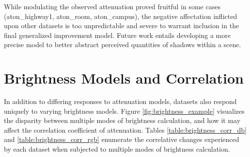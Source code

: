 \documentclass[12pt]{report}
\begin{document}
While modulating the observed attenuation proved fruitful in some cases (aton\_highway1, aton\_room, aton\_campus), the negative affectation inflicted upon other datasets is too unpredictable and severe to warrant inclusion in the final generalized improvement model. Future work entails developing a more precise model to better abstract perceived quantities of shadows within a scene.

\section{Brightness Models and Correlation} \label{section:brightness_models}

In addition to differing responses to attenuation models, datasets also respond uniquely to varying brightness models. Figure \ref{fig:brightness_example} visualizes the disparity between multiple modes of brightness calculation, and how it may affect the correlation coefficient of attenuation. Tables \ref{table:brightness_corr_db} and \ref{table:brightness_corr_rgb} enumerate the correlative changes experienced by each dataset when subjected to multiple modes of brightness calculation.
\end{document}
